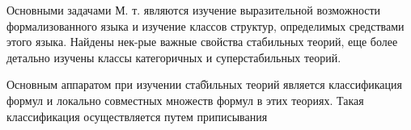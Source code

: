 \documentclass[10pt]{article}
\begin{document}
Основными задачами М. т. являются изучение выразительной возможности формализованного языка и изучение классов структур, определимых средствами этого языка. Найдены нек-рые важные свойства стабильных теорий, еще более детально изучены классы категоричных и суперстабильных теорий.



Основным аппаратом при изучении стаб̆ильных теорий является классификация формул и локально совместных множеств формул в этих теориях. Такая классификация осуществляется путем приписывания
\end{document}
